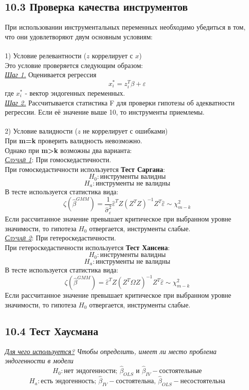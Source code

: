 \documentclass[a0,final]{a0poster}
\begin{document}
\begin{multicols}{4}
\subsection*{\textbf{10.3 Проверка качества инструментов}}
При использовании инструментальных переменных необходимо убедиться в том, что они удовлетворяют двум основным условиям:\\
\\
1) Условие релевантности ($z$ коррелирует с $x$) \\
Это условие проверяется следующим образом: \\
\underline{\textit{Шаг 1.}} Оценивается регрессия
\[x_i^*=z_i^T\beta + \varepsilon\]
где $x_i^*$ - вектор эндогенных переменных. \\
\underline{\textit{Шаг 2.}} Рассчитывается статистика F для проверки гипотезы об адекватности регрессии. Если её значение выше 10, то инструменты приемлемы.\\
\\
2) Условие валидности ($z$ не коррелирует с ошибками) \\
При \textbf{m=k} проверить валидность невозможно. \\
Однако при \textbf{m>k} возможны два варианта: \\

\underline{\textsc{\textit{Случай 1}}}: При гомоскедастичности. \\
При гомоскедастичности используется \textbf{Тест Саргана}:
\[H_0: \text{инструменты валидны}\]
\[H_a: \text{инструменты не валидны}\]
В тесте используется статистика вида:
\[\zeta(\hat{\beta}^{GMM})=\frac{1}{\hat{\sigma}^2_\varepsilon}\hat{\varepsilon}^TZ({Z^TZ})^{-1}Z^T\hat{\varepsilon}\sim\chi^2_{m-k}\]
Если рассчитанное значение превышает критическое при выбранном уровне значимости, то гипотеза $H_0$ отвергается, инструменты слабые.\\

\underline{\textsc{\textit{Случай 2}}}: При гетероскедастичности. \\
При гетероскедастичности используется \textbf{Тест Хансена}:
\[H_0: \text{инструменты валидны}\]
\[H_a: \text{инструменты не валидны}\]
В тесте используется статистика вида:
\[\zeta(\hat{\beta}^{GMM})=\hat{\varepsilon}^TZ({Z^T\hat{\Omega}Z})^{-1}Z^T\hat{\varepsilon}\sim\chi^2_{m-k}\]
Если рассчитанное значение превышает критическое при выбранном уровне значимости, то гипотеза $H_0$ отвергается, инструменты слабые.
\subsection*{\textbf{10.4 Тест Хаусмана}}
\underline{\textit{Для чего используется?}} \textit{Чтобы определить, имеет ли место проблема эндогенности в модели}
\[H_0: \text{нет эндогенности; } \hat{\beta}_{OLS} \text{ и } \hat{\beta}_{IV} - \text{состоятельные}\]
\[H_a: \text{есть эндогенность; } \hat{\beta}_{IV} - \text{состоятельна, }  \hat{\beta}_{OLS} - \text{несостоятельна}\]


\end{multicols}
\end{document}
